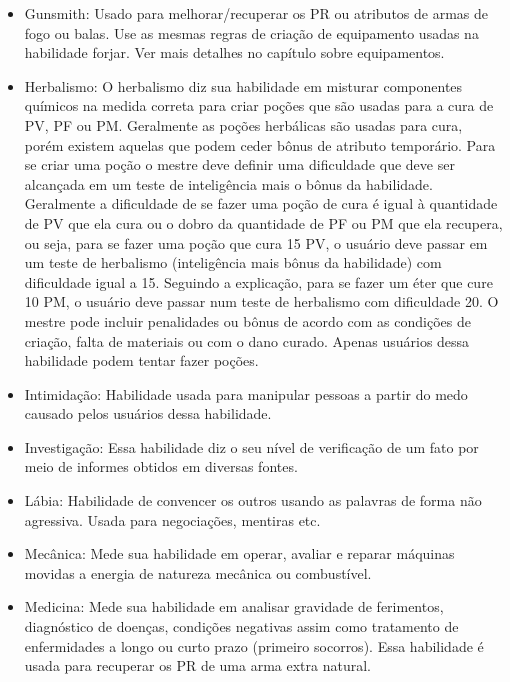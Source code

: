 \begin{itemize}
	\item Gunsmith:	Usado para melhorar/recuperar os PR ou atributos de armas de fogo ou balas. Use as mesmas regras de criação de equipamento usadas na habilidade forjar. Ver mais detalhes no capítulo sobre equipamentos.
	
	\item Herbalismo: O herbalismo diz sua habilidade em misturar componentes químicos na medida correta para criar poções que são usadas para a cura de PV, PF ou PM. Geralmente as poções herbálicas são usadas para cura, porém existem aquelas que podem ceder bônus de atributo temporário. Para se criar uma poção o mestre deve definir uma dificuldade que deve ser alcançada em um teste de inteligência mais o bônus da habilidade. Geralmente a dificuldade de se fazer uma poção de cura é igual à quantidade de PV que ela cura ou o dobro da quantidade de PF ou PM que ela recupera, ou seja, para se fazer uma poção que cura 15 PV, o usuário deve passar em um teste de herbalismo (inteligência mais bônus da habilidade) com dificuldade igual a 15. Seguindo a explicação, para se fazer um éter que cure 10 PM, o usuário deve passar num teste de herbalismo com dificuldade 20. O mestre pode incluir penalidades ou bônus de acordo com as condições de criação, falta de materiais ou com o dano curado. Apenas usuários dessa habilidade podem tentar fazer poções.  		

	\item Intimidação: Habilidade usada para manipular pessoas a partir do medo causado pelos usuários dessa habilidade.	
	
	\item Investigação: Essa habilidade diz o seu nível de verificação de um fato por meio de informes obtidos em diversas fontes.	
	
	\item Lábia: Habilidade de convencer os outros usando as palavras de forma não agressiva. Usada para negociações, mentiras etc.  
	
	\item Mecânica: Mede sua habilidade em operar, avaliar e reparar máquinas movidas a energia de natureza mecânica ou combustível.
	
	\item Medicina: Mede sua habilidade em analisar gravidade de ferimentos, diagnóstico de doenças, condições negativas assim como tratamento de enfermidades a longo ou curto prazo (primeiro socorros). Essa habilidade é usada para recuperar os PR de uma arma extra natural.
	

\end{itemize}

